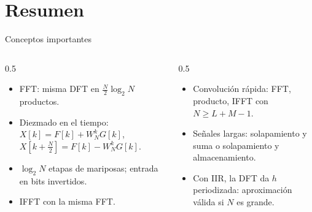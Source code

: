 \documentclass[aspectratio=169,11pt]{beamer}
\begin{document}
\section*{Resumen}
\begin{frame}{Conceptos importantes}
  \begin{columns}[T]
    \begin{column}{0.5\textwidth}
      \begin{itemize}
        \item FFT: misma DFT en $\frac N2\log_2N$ productos.
        \item Diezmado en el tiempo: $X[k]=F[k]+W_N^kG[k]$, $X[k+\frac N2]=F[k]-W_N^kG[k]$.
        \item $\log_2N$ etapas de mariposas; entrada en bits invertidos.
        \item IFFT con la misma FFT.
      \end{itemize}
    \end{column}
    \begin{column}{0.5\textwidth}
      \begin{itemize}
        \item Convolución rápida: FFT, producto, IFFT con $N\ge L+M-1$.
        \item Señales largas: solapamiento y suma o solapamiento y almacenamiento.
        \item Con IIR, la DFT da $h$ periodizada: aproximación válida si $N$ es grande.
      \end{itemize}
    \end{column}
  \end{columns}
  \bigskip
\end{frame}
\end{document}
